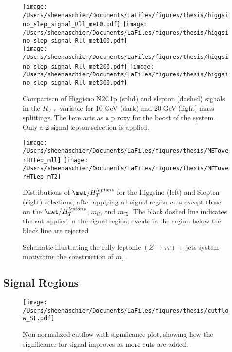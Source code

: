 \documentclass[11pt, oneside]{article}   	%
\begin{document}
  \begin{figure}[tbp]
     \texttt{[image: /Users/sheenaschier/Documents/LaFiles/figures/thesis/higgsino\_slep\_signal\_Rll\_met0.pdf]}
       \texttt{[image: /Users/sheenaschier/Documents/LaFiles/figures/thesis/higgsino\_slep\_signal\_Rll\_met100.pdf]}\\
     \texttt{[image: /Users/sheenaschier/Documents/LaFiles/figures/thesis/higgsino\_slep\_signal\_Rll\_met200.pdf]}
     \texttt{[image: /Users/sheenaschier/Documents/LaFiles/figures/thesis/higgsino\_slep\_signal\_Rll\_met300.pdf]}\\
   \caption{Comparison of Higgisno N2C1p (solid) and slepton (dashed) signals in the $R_{\ell\ell}$ variable for 10 GeV (dark) and 20 GeV (light) mass splittings. The \met{} here acts as a p    roxy for the boost of the system. Only a 2 signal lepton selection is applied.}
   \label{fig:Rll_signals only}
 \end{figure}
 
 \begin{figure}[tbp]
  \centering
  \texttt{[image: /Users/sheenaschier/Documents/LaFiles/figures/thesis/METoverHTLep\_mll]}
  \texttt{[image: /Users/sheenaschier/Documents/LaFiles/figures/thesis/METoverHTLep\_mT2]}
 \caption{Distributions of $\met/H_{T}^{leptons}$ for the Higgsino (left) and Slepton (right) selections, after applying all signal region cuts except those on the $\met/H_{T}^{leptons}$, $m_{ll}$, and $m_{T2}$.  The black dashed line indicates the cut applied in the signal region; events in the region below the black line are rejected.}
 \label{fig:METoverHTLep2D}
 \end{figure}
 
 
  \begin{figure}
  \centering
  
  \caption{Schematic illustrating the fully leptonic $(Z\to\tau\tau)$ + jets system motivating the construction of $m_{\tau\tau}$. }
  \label{fig:ditau_schematic}
  \end{figure}
  \subsection{Signal Regions}
 \begin{figure}[h!]
 \centering
 \texttt{[image: /Users/sheenaschier/Documents/LaFiles/figures/thesis/cutflow\_SF.pdf]}
 \caption{Non-normalized cutflow with significance plot, showing how the significance for signal improves as more cuts are added.}
 \label{fig:cutflow_zn}
 \end{figure}
\end{document}
